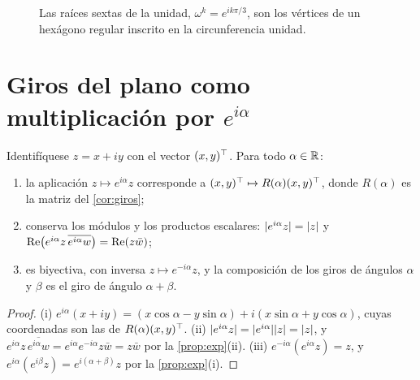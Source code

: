 \begin{figure}[ht]
\centering
{}
\caption{Las raíces sextas de la unidad, $\omega^{k}=e^{ik\pi/3}$, son los vértices de un hexágono regular inscrito en la circunferencia unidad.}
\label{fig:raices}
\end{figure}

\section{Giros del plano como multiplicación por \texorpdfstring{$e^{i\alpha}$}{e\textasciicircum ia}}

\begin{proposicion}[Giros]\label{prop:giro-complejo}
Identifíquese $z=x+iy$ con el vector $(x,y)^{\top}$. Para todo $\alpha\in\mathbb{R}$:
\begin{enumerate}
  \item la aplicación $z\mapsto e^{i\alpha}z$ corresponde a $(x,y)^{\top}\mapsto R(\alpha)(x,y)^{\top}$, donde $R(\alpha)$ es la matriz del \cref{cor:giros};
  \item conserva los módulos y los productos escalares: $\lvert e^{i\alpha}z\rvert=\lvert z\rvert$ y $\operatorname{Re}\bigl(e^{i\alpha}z\,\overline{e^{i\alpha}w}\bigr)=\operatorname{Re}(z\bar w)$;
  \item es biyectiva, con inversa $z\mapsto e^{-i\alpha}z$, y la composición de los giros de ángulos $\alpha$ y $\beta$ es el giro de ángulo $\alpha+\beta$.
\end{enumerate}
\end{proposicion}

\begin{proof}
(i) $e^{i\alpha}(x+iy)=(x\cos\alpha-y\sin\alpha)+i(x\sin\alpha+y\cos\alpha)$, cuyas coordenadas son las de $R(\alpha)(x,y)^{\top}$. (ii) $\lvert e^{i\alpha}z\rvert=\lvert e^{i\alpha}\rvert\lvert z\rvert=\lvert z\rvert$, y $e^{i\alpha}z\,\overline{e^{i\alpha}w}=e^{i\alpha}e^{-i\alpha}z\bar w=z\bar w$ por la \cref{prop:exp}(ii). (iii) $e^{-i\alpha}(e^{i\alpha}z)=z$, y $e^{i\alpha}(e^{i\beta}z)=e^{i(\alpha+\beta)}z$ por la \cref{prop:exp}(i).
\end{proof}

